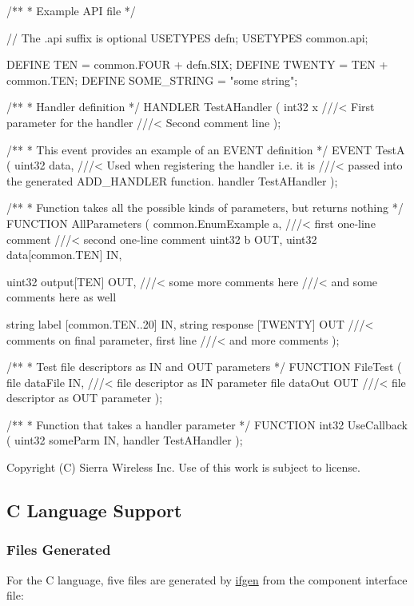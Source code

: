 \begin{DoxyVerbInclude}
/**
 * Example API file
 */

// The .api suffix is optional
USETYPES defn;
USETYPES common.api;


DEFINE TEN = common.FOUR + defn.SIX;
DEFINE TWENTY = TEN + common.TEN;
DEFINE SOME_STRING = "some string";


/**
 * Handler definition
 */
HANDLER TestAHandler
(
    int32 x   ///< First parameter for the handler
              ///< Second comment line
);


/**
 * This event provides an example of an EVENT definition
 */
EVENT TestA
(
    uint32 data,          ///< Used when registering the handler i.e. it is
                          ///< passed into the generated ADD_HANDLER function.
    handler TestAHandler
);


/**
 * Function takes all the possible kinds of parameters, but returns nothing
 */
FUNCTION AllParameters
(
    common.EnumExample a,  ///< first one-line comment
                           ///< second one-line comment
    uint32 b OUT,
    uint32 data[common.TEN] IN,

    uint32 output[TEN] OUT,   ///< some more comments here
    ///< and some comments here as well

    string label [common.TEN..20] IN,
    string response [TWENTY] OUT
    ///< comments on final parameter, first line
    ///< and more comments
);


/**
 * Test file descriptors as IN and OUT parameters
 */
FUNCTION FileTest
(
    file dataFile IN,   ///< file descriptor as IN parameter
    file dataOut OUT    ///< file descriptor as OUT parameter
);

/**
 * Function that takes a handler parameter
 */
FUNCTION int32 UseCallback
(
    uint32 someParm IN,
    handler TestAHandler
);

\end{DoxyVerbInclude}






Copyright (C) Sierra Wireless Inc. Use of this work is subject to license. \hypertarget{interfaceDefLangC}{}\subsection{C Language Support}\label{interfaceDefLangC}
\hypertarget{interface_def_lang_c_interfaceDefLangC_filesGenerated}{}\subsubsection{Files Generated}\label{interface_def_lang_c_interfaceDefLangC_filesGenerated}
For the C language, five files are generated by \hyperlink{buildToolsifgen}{ifgen} from the component interface file\+:


